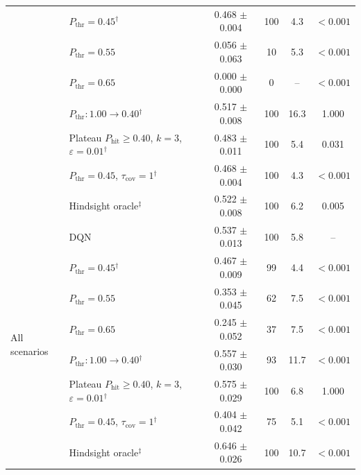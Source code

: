 \begin{table}[htbp]
\begin{tabular}{llcccc}
 & $P_{\mathrm{thr}}=0.45$$^{\dagger}$ & 0.468 $\pm$ 0.004 & 100 & 4.3 & $<0.001$ \\
 & $P_{\mathrm{thr}}=0.55$ & 0.056 $\pm$ 0.063 & 10 & 5.3 & $<0.001$ \\
 & $P_{\mathrm{thr}}=0.65$ & 0.000 $\pm$ 0.000 & 0 & -- & $<0.001$ \\
 & $P_{\mathrm{thr}}: 1.00 \to 0.40$$^{\dagger}$ & 0.517 $\pm$ 0.008 & 100 & 16.3 & 1.000 \\
 & Plateau $P_{\mathrm{hit}}\geq0.40$, $k=3$, $\varepsilon=0.01$$^{\dagger}$ & 0.483 $\pm$ 0.011 & 100 & 5.4 & 0.031 \\
 & $P_{\mathrm{thr}}=0.45$, $\tau_{\mathrm{cov}}=1$$^{\dagger}$ & 0.468 $\pm$ 0.004 & 100 & 4.3 & $<0.001$ \\
 & Hindsight oracle$^{\ddagger}$ & 0.522 $\pm$ 0.008 & 100 & 6.2 & 0.005 \\
\midrule
\multirow{8}{*}{All scenarios} & DQN & 0.537 $\pm$ 0.013 & 100 & 5.8 & -- \\
 & $P_{\mathrm{thr}}=0.45$$^{\dagger}$ & 0.467 $\pm$ 0.009 & 99 & 4.4 & $<0.001$ \\
 & $P_{\mathrm{thr}}=0.55$ & 0.353 $\pm$ 0.045 & 62 & 7.5 & $<0.001$ \\
 & $P_{\mathrm{thr}}=0.65$ & 0.245 $\pm$ 0.052 & 37 & 7.5 & $<0.001$ \\
 & $P_{\mathrm{thr}}: 1.00 \to 0.40$$^{\dagger}$ & 0.557 $\pm$ 0.030 & 93 & 11.7 & $<0.001$ \\
 & Plateau $P_{\mathrm{hit}}\geq0.40$, $k=3$, $\varepsilon=0.01$$^{\dagger}$ & 0.575 $\pm$ 0.029 & 100 & 6.8 & 1.000 \\
 & $P_{\mathrm{thr}}=0.45$, $\tau_{\mathrm{cov}}=1$$^{\dagger}$ & 0.404 $\pm$ 0.042 & 75 & 5.1 & $<0.001$ \\
 & Hindsight oracle$^{\ddagger}$ & 0.646 $\pm$ 0.026 & 100 & 10.7 & $<0.001$ \\
\bottomrule
\end{tabular}
\end{table}
